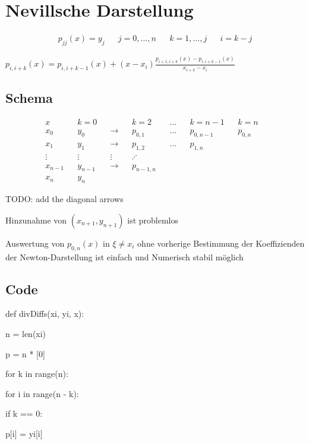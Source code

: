 \documentclass[12pt,a4paper]{article} %
\newcommand*\tab[1][1cm]{\hspace*{#1}}
\begin{document}
	\newpage
	
	\section{Nevillsche Darstellung}
	
	\begin{align*}
		p_{jj}(x) = y_j && j = 0, ..., n && k = 1, ..., j && i = k - j
	\end{align*}
	
	
	$p_{i, i + k}(x) = p_{i, i + k - 1}(x) + (x - x_i)\frac{p_{i + 1, i + k}(x) - p_{i, i + k - 1}(x)}{x_{i + k} - x_i}$
	
	\subsection{Schema}
	
	\begin{align*}
		x && k = 0 && && k = 2 && {}\ldots{} && k = n - 1 && k = n & \\
		x_0 && y_0 && \longrightarrow && p_{0, 1} && {}\ldots{} && p_{0, n - 1} && p_{0, n} & \\
		x_1 && y_1 && \longrightarrow && p_{1, 2} && {}\ldots{} && p_{1, n} & \\
		\vdots && \vdots && \vdots && \iddots & \\
		x_{n - 1} && y_{n - 1} && \longrightarrow && p_{n - 1, n} & \\
		x_n && y_n
	\end{align*}
	
	TODO: add the diagonal arrows
	
	Hinzunahme von $(x_{n + 1}, y_{n + 1})$ ist problemlos
	
	Auswertung von $p_{0, n}(x)$ in $\xi \ne x_i$ ohne vorherige Bestimmung der Koeffizienden der Newton-Darstellung ist einfach und Numerisch stabil möglich
	
	\subsection{Code}
	
	def divDiffs(xi, yi, x):
	
	n = len(xi)
	
	p = n * [0]
	
	for k in range(n):
	
	\tab for i in range(n - k):
	
	\tab \tab if k == 0:

	\tab \tab \tab p[i] = yi[i]
	
\end{document}
